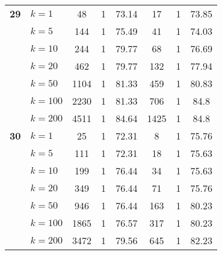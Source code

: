 \begin{table}[htbp]
\begin{tabular}{|l|l|c|c|c|c|c|c|}
    \multicolumn{1}{|r|}{\textbf{29}} & $k=1$ & 48 & 1 & 73.14 & 17 & 1 & 73.85 \\ 
     & $k=5$ & 144 & 1 & 75.49 & 41 & 1 & 74.03 \\ 
     & $k=10$ & 244 & 1 & 79.77 & 68 & 1 & 76.69 \\ 
     & $k=20$ & 462 & 1 & 79.77 & 132 & 1 & 77.94 \\ 
     & $k=50$ & 1104 & 1 & 81.33 & 459 & 1 & 80.83 \\ 
     & $k=100$ & 2230 & 1 & 81.33 & 706 & 1 & 84.8 \\ 
     & $k=200$ & 4511 & 1 & 84.64 & 1425 & 1 & 84.8 \\ \hline
    \multicolumn{1}{|r|}{\textbf{30}} & $k=1$ & 25 & 1 & 72.31 & 8 & 1 & 75.76 \\ 
     & $k=5$ & 111 & 1 & 72.31 & 18 & 1 & 75.63 \\ 
     & $k=10$ & 199 & 1 & 76.44 & 34 & 1 & 75.63 \\ 
     & $k=20$ & 349 & 1 & 76.44 & 71 & 1 & 75.76 \\ 
     & $k=50$ & 946 & 1 & 76.44 & 163 & 1 & 80.23 \\ 
     & $k=100$ & 1865 & 1 & 76.57 & 317 & 1 & 80.23 \\ 
     & $k=200$ & 3472 & 1 & 79.56 & 645 & 1 & 82.23 \\ \hline
    \end{tabular}
\end{table}
